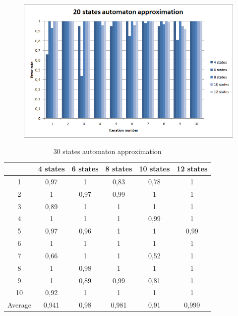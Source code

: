 \documentclass[runningheads,a4paper]{llncs}
\begin{document}
\begin{figure}
\centering
\includegraphics[scale=1]{2.png}
\end{figure}

\begin{table}[]
\centering
\caption{30 states automaton approximation}
\label{my-label}
\begin{tabular}{@{}cccccc@{}}
\toprule
        & 4 states & 6 states & 8 states & 10 states & 12 states    \\ \midrule
1       & 0,97     & 1        & 0,83     & 0,78      & 1 \\
2       & 1        & 0,97     & 0,99     & 1         & 1 \\
3       & 0,89     & 1        & 1        & 1         & 1 \\
4       & 1        & 1        & 1        & 0,99      & 1   \\
5       & 0,97     & 0,96     & 1        & 1         & 0,99   \\
6       & 1        & 1        & 1        & 1         & 1    \\
7       & 0,66     & 1        & 1        & 0,52      & 1    \\
8       & 1        & 0,98     & 1        & 1         & 1     \\
9       & 1        & 0,89     & 0,99     & 0,81      & 1 \\
10      & 0,92     & 1        & 1        & 1         & 1  \\
Average & 0,941    & 0,98     & 0,981    & 0,91      & 0,999  \\ \bottomrule
\end{tabular}
\end{table}
\end{document}
